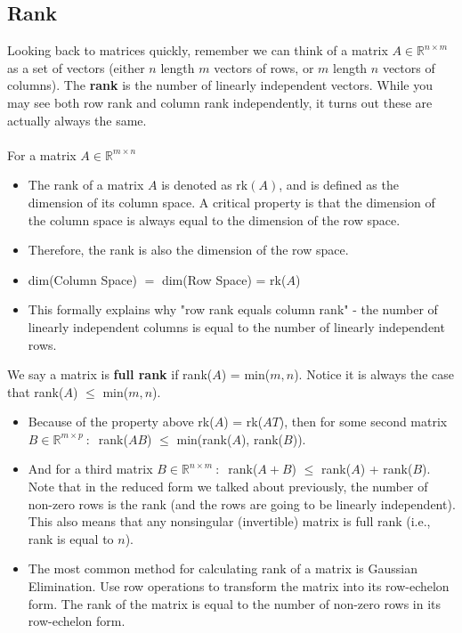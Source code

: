 \documentclass[10pt]{article}
\begin{document}
\subsection*{Rank}
Looking back to matrices quickly, remember we can think of a matrix $A \in \mathbb{R}^{n \times m}$ as a set of vectors (either $n$ length $m$ vectors of rows, or $m$ length $n$ vectors of columns).
The \textbf{rank} is the number of linearly independent vectors.  While you may see both row rank and column rank independently, it turns out these are actually always the same.\\\\
For a matrix $A \in \mathbb{R}^{m \times n}$
\begin{itemize}
	\item The rank of a matrix $A$ is denoted as $\text{rk}(A)$, and is defined as the dimension of its column space.  A critical property is that the dimension of the column space is always equal to the dimension of the row space.
	\item Therefore, the rank is also the dimension of the row space.
	\item dim(Column Space) $=$ dim(Row Space) = rk($A$)
	\item This formally explains why "row rank equals column rank" - the number of linearly independent columns is equal to the number of linearly independent rows.
\end{itemize}
We say a matrix is \textbf{full rank} if rank($A$) = min($m, n$).  Notice it is always the case that rank($A$) $\leq$ min($m, n$).  
\begin{itemize}
	\item Because of the property above rk($A$) = rk($AT$), then for some second matrix $B \in \mathbb{R}^{m \times p} \::\:$ rank($AB$) $\leq$ min(rank($A$), rank($B$)).
	\item And for a third matrix $B \in \mathbb{R}^{n \times m} \::\:$ rank($A + B$) $\leq$ rank($A$) + rank($B$).  Note that in the reduced form we talked about previously, the number of non-zero rows is the rank (and the rows are going to be linearly independent).  This also means that any nonsingular (invertible) matrix is full rank (i.e., rank is equal to $n$).
	\item The most common method for calculating rank of a matrix is Gaussian Elimination.  Use row operations to transform the matrix into its row-echelon form.  The rank of the matrix is equal to the number of non-zero rows in its row-echelon form.
\end{itemize}
\end{document}
